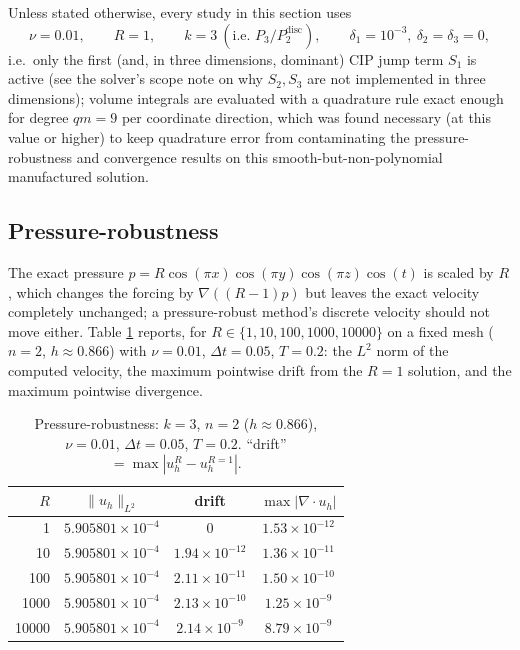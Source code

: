 \documentclass[11pt]{article}
\begin{document}
Unless stated otherwise, every study in this section uses
\[
\nu=0.01,\qquad R=1,\qquad k=3\ (\text{i.e.\ }P_3/P_2^{\mathrm{disc}}),\qquad
\delta_1=10^{-3},\ \delta_2=\delta_3=0,
\]
i.e.\ only the first (and, in three dimensions, dominant) CIP jump term $S_1$ is active
(see the solver's scope note on why $S_2,S_3$ are not implemented in three dimensions);
volume integrals are evaluated with a quadrature rule exact enough for degree $qm=9$ per
coordinate direction, which was found necessary (at this value or higher) to keep
quadrature error from contaminating the pressure-robustness and convergence results on
this smooth-but-non-polynomial manufactured solution.

\subsection{Pressure-robustness}
\label{sec:3d-pressure-robust}

The exact pressure $p=R\cos(\pi x)\cos(\pi y)\cos(\pi z)\cos(t)$ is scaled by $R$, which
changes the forcing by $\nabla((R-1)p)$ but leaves the exact velocity completely
unchanged; a pressure-robust method's discrete velocity should not move either. Table
\ref{tab:3d-pressrob} reports, for $R\in\{1,10,100,1000,10000\}$ on a fixed mesh
($n=2$, $h\approx0.866$) with $\nu=0.01$, $\Delta t=0.05$, $T=0.2$: the $L^2$ norm of the
computed velocity, the maximum pointwise drift from the $R=1$ solution, and the maximum
pointwise divergence.

\begin{table}[h]\centering
\caption{Pressure-robustness: $k=3$, $n=2$ ($h\approx0.866$), $\nu=0.01$, $\Delta t=0.05$,
$T=0.2$. ``drift'' $=\max|u_h^R-u_h^{R=1}|$.}
\label{tab:3d-pressrob}
\begin{tabular}{rccc}
\toprule
$R$ & $\|u_h\|_{L^2}$ & drift & $\max|\nabla\cdot u_h|$ \\
\midrule
1     & $5.905801\times10^{-4}$ & $0$                      & $1.53\times10^{-12}$ \\
10    & $5.905801\times10^{-4}$ & $1.94\times10^{-12}$     & $1.36\times10^{-11}$ \\
100   & $5.905801\times10^{-4}$ & $2.11\times10^{-11}$     & $1.50\times10^{-10}$ \\
1000  & $5.905801\times10^{-4}$ & $2.13\times10^{-10}$     & $1.25\times10^{-9}$  \\
10000 & $5.905801\times10^{-4}$ & $2.14\times10^{-9}$      & $8.79\times10^{-9}$  \\
\bottomrule
\end{tabular}
\end{table}
\end{document}
